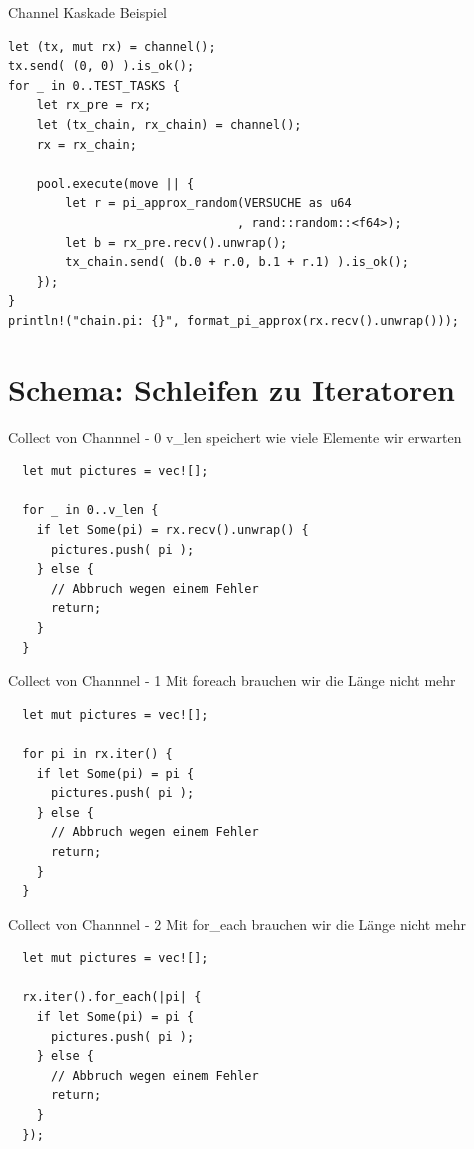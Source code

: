 \documentclass[aspectratio=1610,t]{beamer}
\begin{document}
\begin{frame}[fragile]{Channel Kaskade Beispiel}
\begin{verbatim}
let (tx, mut rx) = channel();
tx.send( (0, 0) ).is_ok();
for _ in 0..TEST_TASKS {
    let rx_pre = rx;
    let (tx_chain, rx_chain) = channel();
    rx = rx_chain;

    pool.execute(move || {
        let r = pi_approx_random(VERSUCHE as u64
                                , rand::random::<f64>);
        let b = rx_pre.recv().unwrap();
        tx_chain.send( (b.0 + r.0, b.1 + r.1) ).is_ok();
    });
}
println!("chain.pi: {}", format_pi_approx(rx.recv().unwrap()));
\end{verbatim}
\end{frame}



{
\section{Schema: Schleifen zu Iteratoren}
}
\begin{frame}[fragile]{Collect von Channnel - 0}
v\_len speichert wie viele Elemente wir erwarten
\begin{verbatim}
  let mut pictures = vec![];

  for _ in 0..v_len {
    if let Some(pi) = rx.recv().unwrap() {
      pictures.push( pi );
    } else {
      // Abbruch wegen einem Fehler
      return;
    }
  }
\end{verbatim}
\end{frame}

\begin{frame}[fragile]{Collect von Channnel - 1}
Mit foreach brauchen wir die Länge nicht mehr
\begin{verbatim}
  let mut pictures = vec![];

  for pi in rx.iter() {
    if let Some(pi) = pi {
      pictures.push( pi );
    } else {
      // Abbruch wegen einem Fehler
      return;
    }
  }
\end{verbatim}
\end{frame}

\begin{frame}[fragile]{Collect von Channnel - 2}
Mit for\_each brauchen wir die Länge nicht mehr
\begin{verbatim}
  let mut pictures = vec![];

  rx.iter().for_each(|pi| {
    if let Some(pi) = pi {
      pictures.push( pi );
    } else {
      // Abbruch wegen einem Fehler
      return;
    }
  });
\end{verbatim}
\end{frame}
\end{document}
